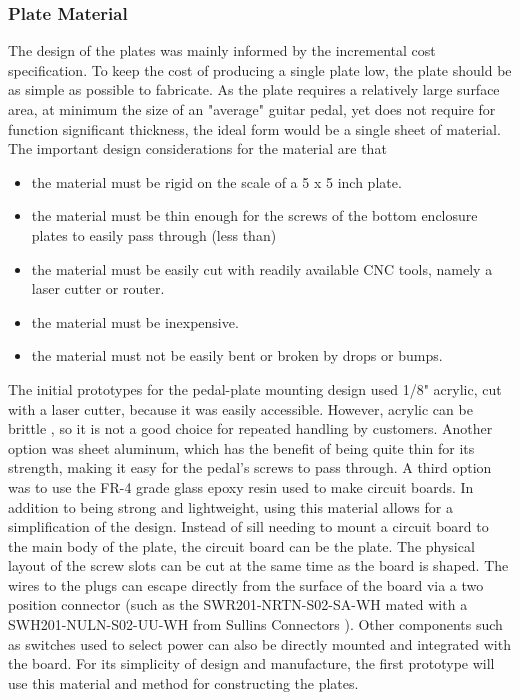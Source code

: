 \documentclass{article}
\begin{document}
		\subsubsection{Plate Material}
		\label{Plate Material}
		The design of the plates was mainly informed by the incremental cost specification.  To keep the cost of producing a single plate low, the plate should be as simple as possible to fabricate.  As the plate requires a relatively large surface area, at minimum the size of an "average" guitar pedal, yet does not require for function significant thickness, the ideal form would be a single sheet of material.  The important design considerations for the material are that 
		\begin{itemize}
			\item the material must be rigid on the scale of a 5 x 5 inch plate.
			\item the material must be thin enough for the screws of the bottom enclosure plates to easily pass through (less than)
			\item the material must be easily cut with readily available CNC tools, namely a laser cutter or router.
			\item the material must be inexpensive.
			\item the material must not be easily bent or broken by drops or bumps.
		\end{itemize}
		The initial prototypes for the pedal-plate mounting design used 1/8" acrylic, cut with a laser cutter, because it was easily accessible.  However, acrylic can be brittle \cite{}, so it is not a good choice for repeated handling by customers.  Another option was sheet aluminum, which has the benefit of being quite thin for its strength, making it easy for the pedal's screws to pass through.  A third option was to use the FR-4 grade glass epoxy resin used to make circuit boards.  In addition to being strong and lightweight, using this material allows for a simplification of the design.  Instead of sill needing to mount a circuit board to the main body of the plate, the circuit board can be the plate.  The physical layout of the screw slots can be cut at the same time as the board is shaped.  The wires to the plugs can escape directly from the surface of the board via a two position connector (such as the SWR201-NRTN-S02-SA-WH mated with a SWH201-NULN-S02-UU-WH from Sullins Connectors \cite{}). Other components such as switches used to select power can also be directly mounted and integrated with the board.  For its simplicity of design and manufacture, the first prototype will use this material and method for constructing the plates.
\end{document}
